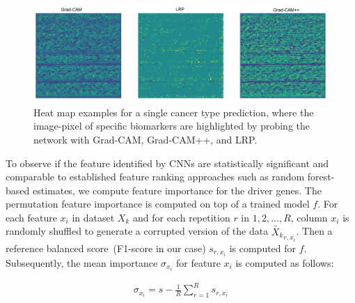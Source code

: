\begin{figure}[h]
	\centering
	\includegraphics[scale=0.7]{images/3_mode.png}
	\caption[Heat map examples for a single cancer type prediction]{Heat map examples for a single cancer type prediction, where the image-pixel of specific biomarkers are highlighted by probing the network with Grad-CAM, Grad-CAM++, and LRP.} 
	\label{fig:3hms}
\end{figure}

\hspace*{3.5mm} To observe if the feature identified by CNNs are statistically significant and comparable to established feature ranking approaches such as random forest-based estimates, we compute feature importance for the driver genes. The permutation feature importance is computed on top of a trained model $f$. For each feature $x_i$ in dataset $X_k$ and for each repetition $r$ in $1, 2, \ldots, R$, column $x_i$ is randomly shuffled to generate a corrupted version of the data $\tilde{X_k}_{r,x_i}$. Then a reference balanced score~(F1-score in our case) $s_{r,x_i}$ is computed for $f$. Subsequently, the mean importance $\sigma_{x_i}$ for feature $x_{i}$ is computed as follows: 

\begin{align}
    \sigma_{x_i}=s-\frac{1}{R} \sum_{r=1}^{R} s_{r,x_i}
\end{align}

